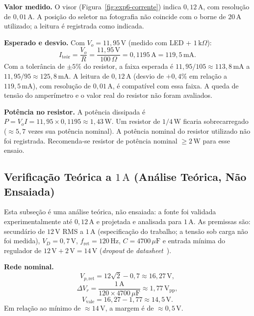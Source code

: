 \textbf{Valor medido.} O visor (Figura~\ref{fig:exp6-corrente}) indica $0{,}12\,\text{A}$, com resolução de $0{,}01\,\text{A}$. A posição do seletor na fotografia não coincide com o borne de $20\,\text{A}$ utilizado; a leitura é registrada como indicada.

\textbf{Esperado e desvio.} Com $V_o = 11{,}95\,\text{V}$ (medido com LED + $1\,\text{k}\Omega$):
\begin{equation}
I_{\text{teór}} = \frac{V_o}{R} = \frac{11{,}95\,\text{V}}{100\,\Omega} = 0{,}1195\,\text{A} = 119{,}5\,\text{mA}.
\label{eq:ohm}
\end{equation}
Com a tolerância de $\pm 5\%$ do resistor, a faixa esperada é $11{,}95/105 \approx 113{,}8\,\text{mA}$ a $11{,}95/95 \approx 125{,}8\,\text{mA}$. A leitura de $0{,}12\,\text{A}$ (desvio de $+0{,}4\%$ em relação a $119{,}5\,\text{mA}$), com resolução de $0{,}01\,\text{A}$, é compatível com essa faixa. A queda de tensão do amperímetro e o valor real do resistor não foram avaliados.

\textbf{Potência no resistor.} A potência dissipada é $P = V_o I = 11{,}95 \times 0{,}1195 \approx 1{,}43\,\text{W}$. Um resistor de $1/4\,\text{W}$ ficaria sobrecarregado ($\approx 5{,}7$ vezes sua potência nominal). A potência nominal do resistor utilizado não foi registrada. Recomenda-se resistor de potência nominal $\geq 2\,\text{W}$ para esse ensaio.

\subsection{Verificação Teórica a $1\,\text{A}$ (Análise Teórica, Não Ensaiada)}
\label{sec:teoria1A}

Esta subseção é uma análise teórica, não ensaiada: a fonte foi validada experimentalmente até $0{,}12\,\text{A}$ e projetada e analisada para $1\,\text{A}$. As premissas são: secundário de $12\,\text{V}$ RMS a $1\,\text{A}$ (especificação do trabalho; a tensão sob carga não foi medida), $V_D = 0{,}7\,\text{V}$, $f_{\text{ret}} = 120\,\text{Hz}$, $C = 4700\,\mu\text{F}$ e entrada mínima do regulador de $12\,\text{V} + 2\,\text{V} = 14\,\text{V}$ (\textit{dropout} de \textit{datasheet}~\cite{ds_lm7812}).

\textbf{Rede nominal.}
\begin{equation}
V_{p,\text{ret}} = 12\sqrt{2} - 0{,}7 \approx 16{,}27\,\text{V},
\label{eq:teoria_nom}
\end{equation}
\begin{equation}
\Delta V_r = \frac{1\,\text{A}}{120 \times 4700\,\mu\text{F}} \approx 1{,}77\,\text{V}_{\text{pp}},
\label{eq:teoria_ripple}
\end{equation}
\begin{equation}
V_{\text{vale}} = 16{,}27 - 1{,}77 \approx 14{,}5\,\text{V}.
\label{eq:teoria_vale}
\end{equation}
Em relação ao mínimo de $\approx 14\,\text{V}$, a margem é de $\approx 0{,}5\,\text{V}$.

